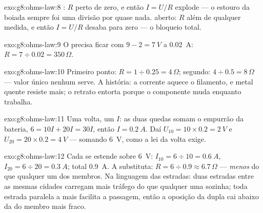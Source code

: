 \begin{solution}{exo:g8:ohms-law:8}
: $R$ perto de zero, e então $I = U/R$ explode --- o
estouro da boiada sempre foi uma divisão por quase nada. 
aberto: $R$ além de qualquer medida, e então $I = U/R$ desaba para
zero --- o bloqueio total.
\end{solution}

\begin{solution}{exo:g8:ohms-law:9}
O  precisa ficar com $9 - 2 = \qty{7}{V}$ a \qty{0.02}{A}:
$R = 7 \div 0.02 = 350\,\Omega$.
\end{solution}

\begin{solution}{exo:g8:ohms-law:10}
Primeiro ponto: $R = 1 \div 0.25 = 4\,\Omega$; segundo:
$4 \div 0.5 = 8\,\Omega$ --- valor único nenhum serve. A história: a
corrente  aquece o filamento, e metal quente resiste mais; o
retrato entorta porque o componente muda enquanto trabalha.
\end{solution}

\begin{solution}{exo:g8:ohms-law:11}
Uma volta, um $I$: as duas quedas somam o empurrão da bateria,
$6 = 10 I + 20 I = 30 I$, então $I = \qty{0.2}{A}$. Daí
$U_{10} = 10 \times 0.2 = \qty{2}{V}$ e
$U_{20} = 20 \times 0.2 = \qty{4}{V}$ --- somando \qty{6}{V}, como a
lei da volta exige.
\end{solution}

\begin{solution}{exo:g8:ohms-law:12}
Cada  se estende sobre \qty{6}{V}:
$I_{10} = 6 \div 10 = \qty{0.6}{A}$,
$I_{20} = 6 \div 20 = \qty{0.3}{A}$; total \qty{0.9}{A}. A
substituta: $R = 6 \div 0.9 \approx 6.7\,\Omega$ --- \emph{menos} do
que qualquer um dos membros. Na linguagem das estradas: duas estradas
entre as mesmas cidades carregam mais tráfego do que qualquer uma
sozinha; toda estrada paralela a mais facilita a passagem, então a
oposição da dupla cai abaixo da do membro mais fraco.
\end{solution}

